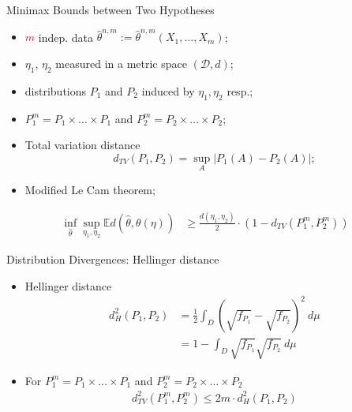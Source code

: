 \documentclass[handout]{beamer}
\begin{document}
\begin{frame}{Minimax Bounds between Two Hypotheses}
\begin{itemize}
\item \textcolor{red}{$m$} indep. data $\hat{\theta}^{n,m}:=\hat{\theta}^{n,m}(X_{1},\ldots,X_{m})$;
\item $\eta_{1}$, $\eta_{2}$ measured in a metric space $(\mathcal{D},d)$;
\item distributions $P_{1}$ and $P_{2}$ induced by $\eta_{1}, \eta_{2}$ resp.;
\item $P_{1}^{m}=P_{1}\times\ldots\times P_{1}$ and $P_{2}^{m}=P_{2}\times\ldots\times P_{2}$;
\item Total variation distance $$d_{TV}(P_{1},P_{2})=\sup_{A}|P_{1}(A)-P_{2}(A)|;$$
\item Modified Le Cam theorem;
\end{itemize}
\begin{align}
\inf_{\hat{\theta}} \sup_{\eta_{1},\eta_{2}} \mathbb{E}d(\hat{\theta},\theta(\eta)) &\geq \frac{d(\eta_{1},\eta_{2})}{2}\cdot (1-d_{TV}(P_{1}^{m},P_{2}^{m}))
\end{align}
\end{frame}
\begin{frame}{Distribution Divergences: Hellinger distance}
\begin{itemize}
\item Hellinger distance
\begin{align*}
d_{H}^{2}(P_{1},P_{2})&=\frac{1}{2}\int_{D} (\sqrt{f_{P_{1}}}-\sqrt{f_{P_{2}}})^{2}~d\mu\\
&=1-\int_{D}\sqrt{f_{P_{1}}}\sqrt{f_{P_{2}}}~d\mu
\end{align*}
\item For $P_{1}^{m}=P_{1}\times\ldots\times P_{1}$ and $P_{2}^{m}=P_{2}\times\ldots\times P_{2}$
\begin{align}d_{TV}^{2}(P_{1}^{m},P_{2}^{m})\leq 2m\cdot d^{2}_{H}(P_{1},P_{2})\end{align}
\end{itemize}
\end{frame}
\end{document}
